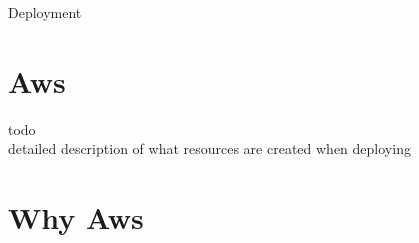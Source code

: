 \begin{chapter}{Deployment}
    \label{chap:deployment}

    \section{Aws}
    todo\\
    detailed description of what resources are created when deploying

    \section{Why Aws}

\end{chapter}